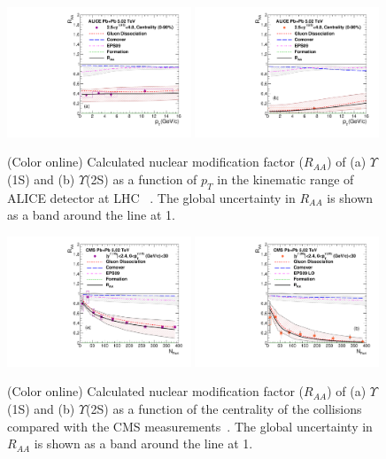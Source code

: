 {\begin{figure}
\includegraphics[width=0.49\textwidth]{Figures/Fig21l_ALICE_Y1SRAAPt_Shade.pdf}
\includegraphics[width=0.49\textwidth]{Figures/Fig21r_ALICE_Y2SRAAPt_Shade.pdf}
\caption{(Color online) Calculated nuclear modification factor ($R_{AA}$) \cite{Kumar:2019xdj}
  of (a) $\Upsilon$(1S) and 
  (b) $\Upsilon$(2S) as a function of $p_{T}$ in the kinematic range of ALICE detector
at LHC ~\cite{ALICE:2020wwx}. The global uncertainty in $R_{AA}$ is shown as a band
around the line at 1.
} 
\label{fig:UpsilonRaaPtALICE}
\end{figure}

\begin{figure}
\includegraphics[width=0.49\textwidth]{Figures/Fig22l_CMS_Y1SRAANPart_Shade.pdf}
\includegraphics[width=0.49\textwidth]{Figures/Fig22r_CMS_Y2SRAANPart_Shade.pdf}
\caption{(Color online) Calculated nuclear modification factor ($R_{AA}$) \cite{Kumar:2019xdj} of 
  (a) $\Upsilon$(1S) and (b) $\Upsilon$(2S) as a function of the centrality of the 
  collisions compared with the CMS measurements~\cite{CMS:2018zza}. The global uncertainty
  in $R_{AA}$ is shown as a band around the line at 1.
}
\label{fig:UpsilonRaaNPartCMS}
\end{figure}


}
